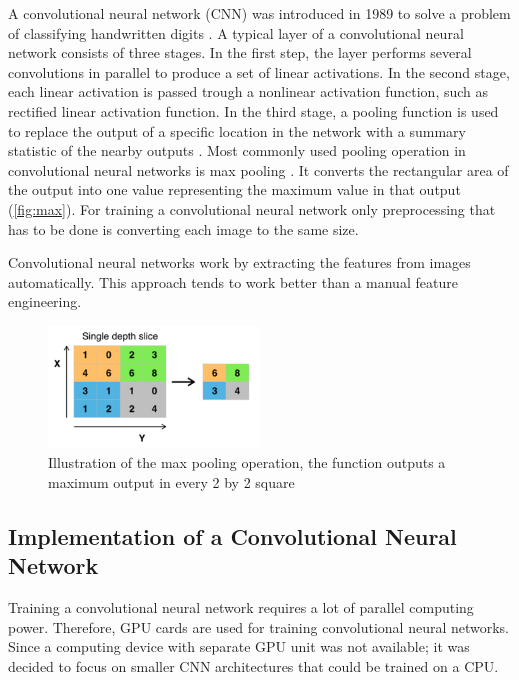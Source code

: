 A convolutional neural network (CNN) was introduced in 1989 to solve a problem of classifying handwritten digits \cite{lecun}.
A typical layer of a convolutional neural network consists of three stages. In the first step, the layer performs several convolutions in parallel to produce a set of linear activations. In the second stage, each linear activation is passed trough a nonlinear activation function, such as rectified linear activation function. In the third stage, a pooling function is used to replace the output of a specific location in the network with a summary statistic of the nearby outputs \cite{Goodfellow-et-al-2017}. Most commonly used pooling operation in convolutional neural networks is max pooling \cite{max}. It converts the rectangular area of the output into one value representing the maximum value in that output (\autoref{fig:max}). For training a convolutional neural network only preprocessing that has to be done is converting each image to the same size.

Convolutional neural networks work by extracting the features from images automatically. This approach tends to work better than a manual feature engineering.

\begin{figure}[h]
\centering
\includegraphics[width=0.5\textwidth]{Figures/4/Max_pooling.png}
\caption{Illustration of the max pooling operation, the function outputs a maximum output in every 2 by 2 square \citep{wiki:Convolutional}}
\label{fig:max}
\end{figure}
 

\subsection{Implementation of a Convolutional Neural Network}

Training a convolutional neural network requires a lot of parallel computing power. Therefore,  GPU cards are used for training convolutional neural networks. Since a computing device with separate GPU unit was not available; it was decided to focus on smaller CNN architectures that could be trained on a CPU.

